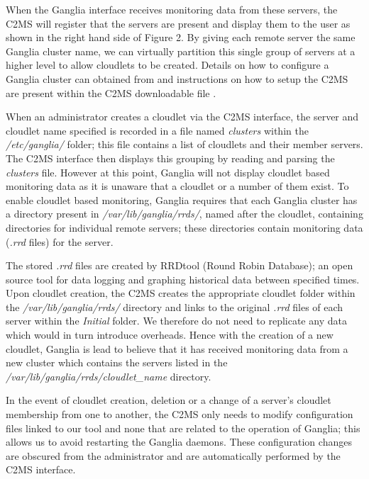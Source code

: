\documentclass[10pt, conference, compsocconf]{IEEEtran}
\begin{document}
When the Ganglia interface receives monitoring data from these servers, the C2MS will register that the servers are present and display them to the user as shown in the right hand side of Figure 2. By giving each remote server the same Ganglia cluster name, we can virtually partition this single group of servers at a higher level to allow cloudlets to be created. Details on how to configure a Ganglia cluster can obtained from \cite{ganglia_website} and instructions on how to setup the C2MS are present within the C2MS downloadable file \cite{c2ms_gary}.

When an administrator creates a cloudlet via the C2MS interface, the server and cloudlet name specified is recorded in a file named \textit{clusters} within the \textit{/etc/ganglia/} folder; this file contains a list of cloudlets and their member servers. The C2MS interface then  displays this grouping by reading and parsing the \textit{clusters} file. However at this point, Ganglia will not display cloudlet based monitoring data as it is unaware that a cloudlet or a number of them exist. To enable cloudlet based monitoring, Ganglia requires that each Ganglia cluster has a directory present in \textit{/var/lib/ganglia/rrds/}, named after the cloudlet, containing directories for individual remote servers; these directories contain monitoring data (\textit{.rrd} files) for the server. 

The stored \textit{.rrd} files are created by RRDtool (Round Robin Database); an open source tool for data logging and graphing historical data between specified times. Upon cloudlet creation, the C2MS creates the appropriate cloudlet folder within the \textit{/var/lib/ganglia/rrds/} directory and links to the original \textit{.rrd} files of each server within the \textit{Initial} folder. We therefore do not need to replicate any data which would in turn introduce overheads. Hence with the creation of a new cloudlet, Ganglia is lead to believe that it has received monitoring data from a new cluster which contains the servers listed in the \textit{/var/lib/ganglia/rrds/cloudlet\_name} directory.

In the event of cloudlet creation, deletion or a change of a server's cloudlet membership from one to another, the C2MS only needs to modify configuration files linked to our tool and none that are related to the operation of Ganglia; this allows us to avoid restarting the Ganglia daemons. These configuration changes are obscured from the administrator and are automatically performed by the C2MS interface. 
\end{document}

